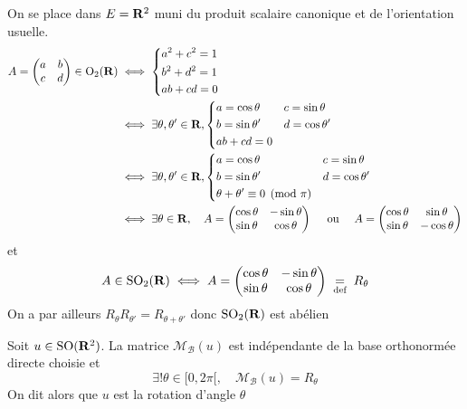 On se place dans $E=\mathbf R^2 $ muni du produit scalaire canonique et de l'orientation usuelle. \begin{align*}
    A= \begin{pmatrix}
        a&b\\c&d
    \end{pmatrix} \in  \mathrm O_2(\mathbf R) & \iff  \begin{dcases}
    a^2 + c^2 = 1 \\ b^2 + d^2 = 1 \\ ab+cd=0
    \end{dcases} \\
    & \iff \exists \theta, \theta' \in  \mathbf R , \begin{dcases}
        a = \cos \theta & c=\sin \theta \\ b=\sin \theta' & d=\cos \theta' \\ ab+cd=0
    \end{dcases} \\
    & \iff  \exists \theta, \theta' \in  \mathbf R , \begin{dcases}
        a = \cos \theta & c=\sin \theta \\ b=\sin \theta' & d=\cos \theta' \\ \theta+\theta'\equiv 0\pmod\pi
    \end{dcases} \\
    &\iff  \exists  \theta \in  \mathbf R, \quad  A = \begin{pmatrix}
        \cos \theta & -\sin \theta \\ \sin \theta & \cos \theta
    \end{pmatrix}
    \quad  \text{ ou } \quad A = \begin{pmatrix}
        \cos \theta & \sin \theta \\ \sin \theta & -\cos \theta
    \end{pmatrix}
\end{align*}
et \[
    A \in  \mathrm {SO}_2(\mathbf R) \iff  A= \begin{pmatrix}
        \cos \theta & -\sin \theta \\
        \sin \theta & \cos \theta
    \end{pmatrix}\;\underset{\text{def}}=\; R_{\theta}
\] 
On a par ailleurs $R_{\theta}R_{\theta'}=R_{\theta+\theta'}$ donc $\mathrm {SO}_2(\mathbf R)$ est abélien

\begin{prop}
    Soit $u \in  \mathrm {SO}(\mathbf R^2)$. La matrice $\mathcal  M_{\mathcal B}(u)$ est indépendante de la base orthonormée directe choisie et \[
        \exists  !\theta \in  [0, 2\pi[, \quad  \mathcal  M_{\mathcal  B}(u)=R_{\theta}
    \] 
    On dit alors que $u$ est la rotation d'angle $\theta$
\end{prop}

